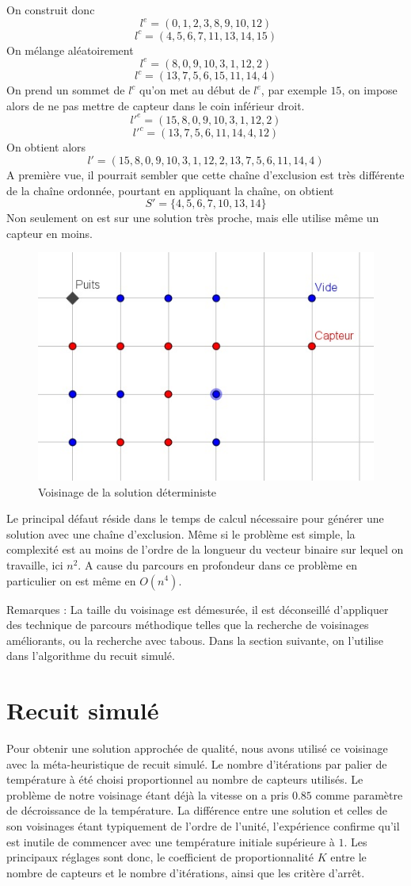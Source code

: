 \documentclass[12pt,a4paper]{article}
\begin{document}
On construit donc 
\[l^e=(0,1,2,3,8,9,10,12)\]
\[l^c=(4,5,6,7,11,13,14,15)\]
On mélange aléatoirement
\[l^e=(8,0,9,10,3,1,12,2)\]
\[l^c=(13,7,5,6,15,11,14,4)\]
On prend un sommet de $l^c$ qu'on met au début de $l^e$, par exemple $15$, on impose alors de ne pas mettre de capteur dans le coin inférieur droit.
\[l'^e=(15,8,0,9,10,3,1,12,2)\]
\[l'^c=(13,7,5,6,11,14,4,12)\]
On obtient alors 
\[l'=(15,8,0,9,10,3,1,12,2,13,7,5,6,11,14,4)\]
A première vue, il pourrait sembler que cette chaîne d'exclusion est très différente de la chaîne ordonnée, pourtant en appliquant la chaîne, on obtient
\[S'=\{4,5,6,7,10,13,14\}\]
Non seulement on est sur une solution très proche, mais elle utilise même un capteur en moins.
\begin{figure}[!h]
\center
\includegraphics[scale=1]{Images/4_1_1_neigh.jpg}
\caption{Voisinage de la solution déterministe}
\end{figure}

Le principal défaut réside dans le temps de calcul nécessaire pour générer une solution avec une chaîne d'exclusion. Même si le problème est simple, la complexité est au moins de l'ordre de la longueur du vecteur binaire sur lequel on travaille, ici $n^2$. A cause du parcours en profondeur dans ce problème en particulier on est même en $O(n^4)$.  

Remarques : La taille du voisinage est démesurée, il est déconseillé d'appliquer des technique de parcours méthodique telles que la recherche de voisinages améliorants, ou la recherche avec tabous. Dans la section suivante, on l'utilise dans l'algorithme du recuit simulé.
\section{Recuit simulé}
Pour obtenir une solution approchée de qualité, nous avons utilisé ce voisinage avec la méta-heuristique de recuit simulé. Le nombre d'itérations par palier de température à été choisi proportionnel au nombre de capteurs utilisés. Le problème de notre voisinage étant déjà la vitesse on a pris $0.85$ comme paramètre de décroissance de la température. La différence entre une solution et celles de son voisinages étant typiquement de l'ordre de l'unité, l'expérience confirme qu'il est inutile de commencer avec une température initiale supérieure à $1$. Les principaux réglages sont donc, le coefficient de proportionnalité $K$ entre le nombre de capteurs et le nombre d'itérations, ainsi que les critère d'arrêt.
\end{document}
